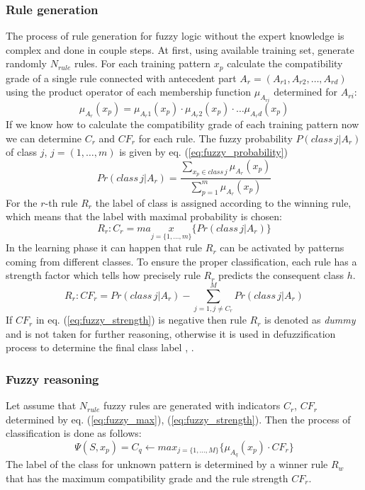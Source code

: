 \subsubsection{Rule generation}
\label{cha:Fuzzy_logic_rule_generation}
The process of rule generation for fuzzy logic without the expert knowledge is
complex and done in couple steps. At first, using available
training set, generate randomly $N_{rule}$ rules. For
each training pattern $x_p$ calculate the compatibility grade of a single rule
connected with antecedent part $A_r = (A_{r1}, A_{r2}, \ldots, A_{rd})$ using
the product operator of each membership function $\mu_{A_{ri}}$ determined for
$A_{ri}$:
\begin{equation}
    \mu_{A_r}(x_p)=\mu_{A_r1}(x_p)\cdot\mu_{A_r2}(x_p)\cdot\ldots\mu_{A_rd}(x_p)
    \label{eq:mu_product}
\end{equation}
If we know how to calculate the compatibility grade of each training pattern
now we can determine $C_r$ and $CF_r$ for each rule. The fuzzy probability
$P(class\, j|A_r)$ of class $j$, $j=(1, \ldots, m)$ is given by eq. (\ref{eq:fuzzy_probability})
\begin{equation}
    Pr(class \, j|A_r) = \frac{\sum\limits_{x_p \in class\,
    j}\mu_{A_r}(x_p)}{\sum\limits_{p=1}^m\mu_{A_r}(x_p)}
    \label{eq:fuzzy_probability}
\end{equation}
For the $r$-th rule $R_r$ the label of class is assigned according to the
winning rule, which means that the label with maximal probability is chosen:
\begin{equation}
    R_r: C_r = max\limits_{j=\{1, \ldots, m\}}\{Pr(class\,j|A_r)\}
    \label{eq:fuzzy_max}
\end{equation}
In the learning phase it can happen that rule $R_r$ can be activated by
patterns coming from different classes. To ensure the proper classification, each
rule has a strength factor which tells how precisely rule $R_r$ predicts the
consequent class $h$.
\begin{equation}
    R_r: CF_r=Pr(class\, j|A_r) - \sum\limits_{j=1, j\neq C_r}^MPr(class\,j|A_r)
    \label{eq:fuzzy_strength}
\end{equation}
If $CF_r$ in eq. (\ref{eq:fuzzy_strength}) is negative then rule $R_r$ is
denoted as \textit{dummy} and is not taken for further reasoning, otherwise it is used in
defuzzification process to determine the final class label \cite{bib18}, \cite{bib26}.
\subsubsection{Fuzzy reasoning}
\label{cha:Fuzzy_reasoning}
Let assume that $N_{rule}$ fuzzy rules are generated with indicators $C_r$,
$CF_r$ determined by eq. (\ref{eq:fuzzy_max}), (\ref{eq:fuzzy_strength}). 
Then the process of classification is done as follows:
\begin{equation}
    \Psi(S, x_p) =  C_q \leftarrow max_{j=\{1,\ldots,
    M\}}\{\mu_{A_{q}}(x_p)\cdot CF_r\}
    \label{eq:fuzzy_classification}
\end{equation}
The label of the class for unknown pattern is determined by a winner rule $R_w$
that has the maximum compatibility grade and the rule strength $CF_r$.

